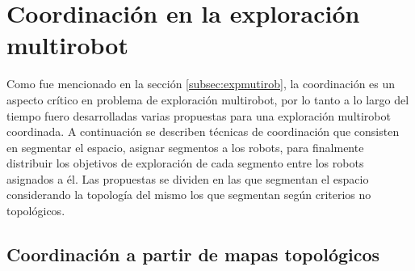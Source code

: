 




\section{Coordinación en la exploración multirobot}
Como fue mencionado en la sección \ref{subsec:expmutirob}, la coordinación es
un aspecto crítico en problema de exploración multirobot, por lo tanto a lo
largo del tiempo fuero desarrolladas varias propuestas para una exploración
multirobot coordinada. A continuación se describen técnicas de coordinación que
consisten en segmentar el espacio, asignar segmentos a los robots, para
finalmente distribuir los objetivos de exploración de cada segmento entre los
robots asignados a él. Las propuestas se dividen en las que segmentan el
espacio considerando la topología del mismo los que segmentan según criterios
no topológicos.

\subsection{Coordinación a partir de mapas topológicos} \label{subsec:wurmCoord}


